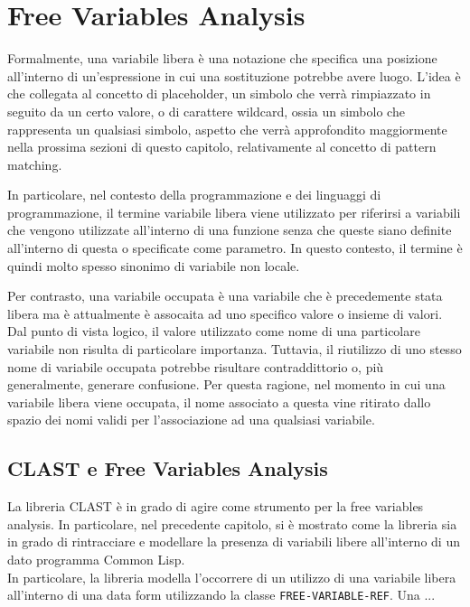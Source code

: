 \section{Free Variables Analysis}
\label{free-variables-analysis}

Formalmente, una variabile libera è una notazione che specifica una posizione
all'interno di un'espressione in cui una sostituzione potrebbe avere luogo.
L'idea è che collegata al concetto di placeholder, un simbolo che verrà
rimpiazzato in seguito da un certo valore, o di carattere wildcard, ossia un
simbolo che rappresenta un qualsiasi simbolo, aspetto che verrà approfondito
maggiormente nella prossima sezioni di questo capitolo, relativamente al
concetto di pattern matching.

In particolare, nel contesto della programmazione e dei linguaggi di
programmazione, il termine variabile libera viene utilizzato per riferirsi a
variabili che vengono utilizzate all'interno di una funzione senza che queste
siano definite all'interno di questa o specificate come parametro. In questo
contesto, il termine è quindi molto spesso sinonimo di variabile non locale.

Per contrasto, una variabile occupata è una variabile che è precedemente stata
libera ma è attualmente è assocaita ad uno specifico valore o insieme di
valori.\\

Dal punto di vista logico, il valore utilizzato come nome di una particolare
variabile non risulta di particolare importanza. Tuttavia, il riutilizzo di uno
stesso nome di variabile occupata potrebbe risultare contraddittorio o, più
generalmente, generare confusione. Per questa ragione, nel momento in cui una
variabile libera viene occupata, il nome associato a questa vine ritirato dallo
spazio dei nomi validi per l'associazione ad una qualsiasi variabile.

\subsection{CLAST e Free Variables Analysis}

La libreria CLAST è in grado di agire come strumento per la free variables
analysis. In particolare, nel precedente capitolo, si è mostrato come la
libreria sia in grado di rintracciare e modellare la presenza di variabili
libere all'interno di un dato programma Common Lisp.\\

In particolare, la libreria modella l'occorrere di un utilizzo di una variabile
libera all'interno di una data form utilizzando la classe \texttt
{FREE-VARIABLE-REF}. Una ...\\

